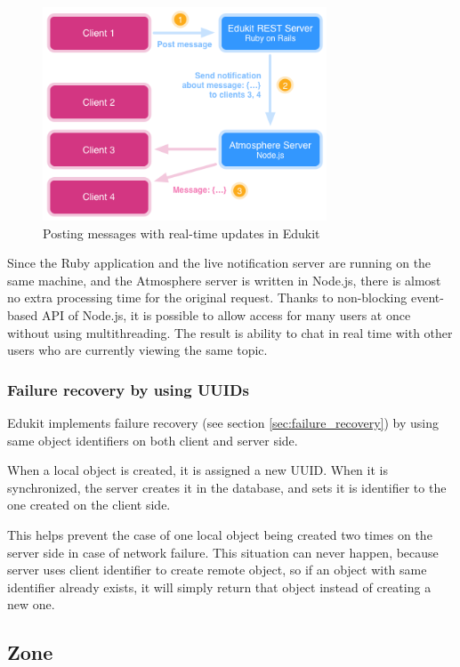 \begin{figure}[htbp]
  \centering
    \includegraphics[height=2.5in]{figures/EdukitMessages.png}
  \caption{Posting messages with real-time updates in Edukit}
  \label{fig:figures_EdukitMessages}
\end{figure}


Since the Ruby application and the live notification server are running on the same machine, and the Atmosphere server is written in Node.js, there is almost no extra processing time for the original request. Thanks to non-blocking event-based API of Node.js, it is possible to allow access for many users at once without using multithreading. \citep{nodejs_book} The result is ability to chat in real time with other users who are currently viewing the same topic.

\subsubsection{Failure recovery by using UUIDs}

Edukit implements failure recovery (see section \ref{sec:failure_recovery}) by using same object identifiers on both client and server side.

When a local object is created, it is assigned a new UUID. When it is synchronized, the server creates it in the database, and sets it is identifier to the one created on the client side.

This helps prevent the case of one local object being created two times on the server side in case of network failure. This situation can never happen, because server uses client identifier to create remote object, so if an object with same identifier already exists, it will simply return that object instead of creating a new one.

\subsection{Zone}

